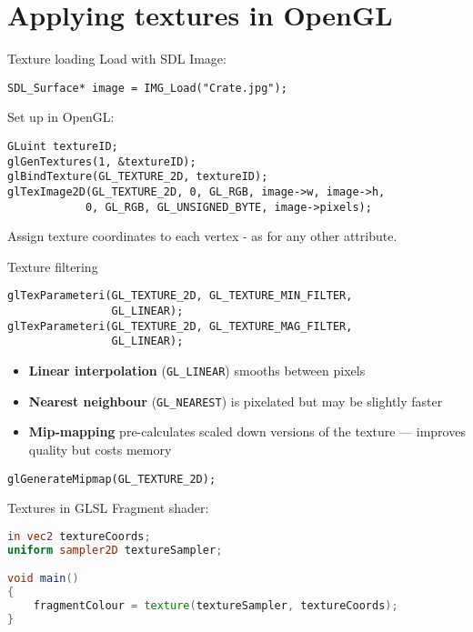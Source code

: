 \part{Applying textures in OpenGL}
\frame{\partpage}

\begin{frame}[fragile]{Texture loading}
	\pause Load with SDL Image:
	\begin{lstlisting}
SDL_Surface* image = IMG_Load("Crate.jpg");
	\end{lstlisting}
	\pause Set up in OpenGL:
	\begin{lstlisting}
GLuint textureID;
glGenTextures(1, &textureID);
glBindTexture(GL_TEXTURE_2D, textureID);
glTexImage2D(GL_TEXTURE_2D, 0, GL_RGB, image->w, image->h,
			0, GL_RGB, GL_UNSIGNED_BYTE, image->pixels);
	\end{lstlisting}
	\pause Assign texture coordinates to each vertex - as for any other attribute.
\end{frame}

\begin{frame}[fragile]{Texture filtering}
	\begin{lstlisting}
glTexParameteri(GL_TEXTURE_2D, GL_TEXTURE_MIN_FILTER,
				GL_LINEAR);
glTexParameteri(GL_TEXTURE_2D, GL_TEXTURE_MAG_FILTER,
				GL_LINEAR);
	\end{lstlisting}
	\begin{itemize}
		\pause\item \textbf{Linear interpolation} (\lstinline{GL_LINEAR})
			smooths between pixels
		\pause\item \textbf{Nearest neighbour} (\lstinline{GL_NEAREST})
			is pixelated but may be slightly faster
		\pause\item \textbf{Mip-mapping} pre-calculates scaled down versions of the texture ---
			improves quality but costs memory
	\end{itemize}
	\pause \begin{lstlisting}
glGenerateMipmap(GL_TEXTURE_2D);
	\end{lstlisting}
\end{frame}

\begin{frame}[fragile]{Textures in GLSL}
	Fragment shader:
	
	\begin{lstlisting}[language=GLSL]
in vec2 textureCoords;
uniform sampler2D textureSampler;

void main()
{
    fragmentColour = texture(textureSampler, textureCoords);
}
	\end{lstlisting}
\end{frame}

